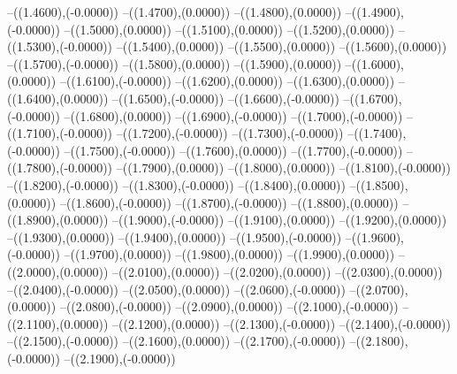 {	--({\sx*(1.4600)},{\sy*(-0.0000)})
	--({\sx*(1.4700)},{\sy*(0.0000)})
	--({\sx*(1.4800)},{\sy*(0.0000)})
	--({\sx*(1.4900)},{\sy*(-0.0000)})
	--({\sx*(1.5000)},{\sy*(0.0000)})
	--({\sx*(1.5100)},{\sy*(0.0000)})
	--({\sx*(1.5200)},{\sy*(0.0000)})
	--({\sx*(1.5300)},{\sy*(-0.0000)})
	--({\sx*(1.5400)},{\sy*(0.0000)})
	--({\sx*(1.5500)},{\sy*(0.0000)})
	--({\sx*(1.5600)},{\sy*(0.0000)})
	--({\sx*(1.5700)},{\sy*(-0.0000)})
	--({\sx*(1.5800)},{\sy*(0.0000)})
	--({\sx*(1.5900)},{\sy*(0.0000)})
	--({\sx*(1.6000)},{\sy*(0.0000)})
	--({\sx*(1.6100)},{\sy*(-0.0000)})
	--({\sx*(1.6200)},{\sy*(0.0000)})
	--({\sx*(1.6300)},{\sy*(0.0000)})
	--({\sx*(1.6400)},{\sy*(0.0000)})
	--({\sx*(1.6500)},{\sy*(-0.0000)})
	--({\sx*(1.6600)},{\sy*(-0.0000)})
	--({\sx*(1.6700)},{\sy*(-0.0000)})
	--({\sx*(1.6800)},{\sy*(0.0000)})
	--({\sx*(1.6900)},{\sy*(-0.0000)})
	--({\sx*(1.7000)},{\sy*(-0.0000)})
	--({\sx*(1.7100)},{\sy*(-0.0000)})
	--({\sx*(1.7200)},{\sy*(-0.0000)})
	--({\sx*(1.7300)},{\sy*(-0.0000)})
	--({\sx*(1.7400)},{\sy*(-0.0000)})
	--({\sx*(1.7500)},{\sy*(-0.0000)})
	--({\sx*(1.7600)},{\sy*(0.0000)})
	--({\sx*(1.7700)},{\sy*(-0.0000)})
	--({\sx*(1.7800)},{\sy*(-0.0000)})
	--({\sx*(1.7900)},{\sy*(0.0000)})
	--({\sx*(1.8000)},{\sy*(0.0000)})
	--({\sx*(1.8100)},{\sy*(-0.0000)})
	--({\sx*(1.8200)},{\sy*(-0.0000)})
	--({\sx*(1.8300)},{\sy*(-0.0000)})
	--({\sx*(1.8400)},{\sy*(0.0000)})
	--({\sx*(1.8500)},{\sy*(0.0000)})
	--({\sx*(1.8600)},{\sy*(-0.0000)})
	--({\sx*(1.8700)},{\sy*(-0.0000)})
	--({\sx*(1.8800)},{\sy*(0.0000)})
	--({\sx*(1.8900)},{\sy*(0.0000)})
	--({\sx*(1.9000)},{\sy*(-0.0000)})
	--({\sx*(1.9100)},{\sy*(0.0000)})
	--({\sx*(1.9200)},{\sy*(0.0000)})
	--({\sx*(1.9300)},{\sy*(0.0000)})
	--({\sx*(1.9400)},{\sy*(0.0000)})
	--({\sx*(1.9500)},{\sy*(-0.0000)})
	--({\sx*(1.9600)},{\sy*(-0.0000)})
	--({\sx*(1.9700)},{\sy*(0.0000)})
	--({\sx*(1.9800)},{\sy*(0.0000)})
	--({\sx*(1.9900)},{\sy*(0.0000)})
	--({\sx*(2.0000)},{\sy*(0.0000)})
	--({\sx*(2.0100)},{\sy*(0.0000)})
	--({\sx*(2.0200)},{\sy*(0.0000)})
	--({\sx*(2.0300)},{\sy*(0.0000)})
	--({\sx*(2.0400)},{\sy*(-0.0000)})
	--({\sx*(2.0500)},{\sy*(0.0000)})
	--({\sx*(2.0600)},{\sy*(-0.0000)})
	--({\sx*(2.0700)},{\sy*(0.0000)})
	--({\sx*(2.0800)},{\sy*(-0.0000)})
	--({\sx*(2.0900)},{\sy*(0.0000)})
	--({\sx*(2.1000)},{\sy*(-0.0000)})
	--({\sx*(2.1100)},{\sy*(0.0000)})
	--({\sx*(2.1200)},{\sy*(0.0000)})
	--({\sx*(2.1300)},{\sy*(-0.0000)})
	--({\sx*(2.1400)},{\sy*(-0.0000)})
	--({\sx*(2.1500)},{\sy*(-0.0000)})
	--({\sx*(2.1600)},{\sy*(0.0000)})
	--({\sx*(2.1700)},{\sy*(-0.0000)})
	--({\sx*(2.1800)},{\sy*(-0.0000)})
	--({\sx*(2.1900)},{\sy*(-0.0000)})
}
